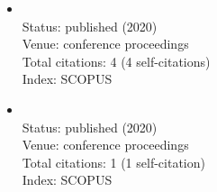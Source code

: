 \begin{refsection}
\begin{itemize}
		\item{}\vspace{2mm}\\Status: published (2020)\\Venue: conference proceedings\\Total citations: 4 (4 self-citations)\\Index: SCOPUS
		\item{}\vspace{2mm}\\Status: published (2020)\\Venue: conference proceedings\\Total citations: 1 (1 self-citation)\\Index: SCOPUS
\end{itemize}
\end{refsection}
